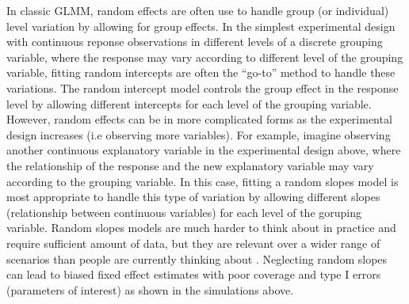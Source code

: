 \documentclass[12pt]{article}
\begin{document}
In classic GLMM, random effects are often use to handle group (or individual) level variation by allowing for group effects. 
In the simplest experimental design with continuous reponse observations in different levels of a discrete grouping variable, where the response may vary according to different level of the grouping variable, fitting random intercepts are often the ``go-to'' method to handle these variations.
The random intercept model controls the group effect in the response level by allowing different intercepts for each level of the grouping variable.
However, random effects can be in more complicated forms as the experimental design increases (i.e observing more variables).  
For example, imagine observing another continuous explanatory variable in the experimental design above, where the relationship of the response and the new explanatory variable may vary according to the grouping variable.
In this case, fitting a random slopes model is most appropriate to handle this type of variation by allowing different slopes (relationship between continuous variables) for each level of the goruping variable.
Random slopes models are much harder to think about in practice and require sufficient amount of data, but they are relevant over a wider range of scenarios than people are currently thinking about \cite{schielzeth2008conclusions, cleasby2015quantifying,ord2010adaptation}.
Neglecting random slopes can lead to biased fixed effect estimates with poor coverage and type I errors \citep{schielzeth2008conclusions} (parameters of interest) as shown in the simulations above.
\end{document}
